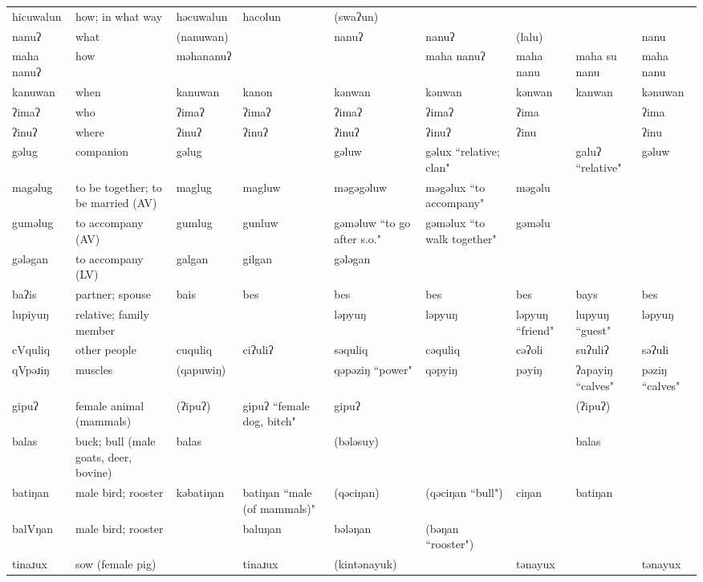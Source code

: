 \begin{landscape}
\begin{longtable}{*{9}{>{\raggedright\arraybackslash}p{}}}
\text{*}hicuwalun & how; in what way & həcuwalun & hacolun & (swaʔun) &  &  &  & \\
\text{*}nanuʔ & what & (nanuwan) &  & nanuʔ & nanuʔ & (lalu) &  & nanu\\
\text{*}maha nanuʔ & how & məhananuʔ &  &  & maha nanuʔ & maha nanu & maha su nanu & maha nanu\\
\text{*}kanuwan & when & kanuwan & kanon & kənwan & kənwan & kənwan & kanwan & kənuwan\\
\text{*}ʔimaʔ & who & ʔimaʔ & ʔimaʔ & ʔimaʔ & ʔimaʔ & ʔima &  & ʔima\\
\text{*}ʔinuʔ & where & ʔinuʔ & ʔinuʔ & ʔinuʔ & ʔinuʔ & ʔinu &  & ʔinu\\
\text{*}gəlug & companion & gəlug &  & gəluw & gəlux ``relative; clan" &  & galuʔ \newline ``relative" & gəluw\\
\text{*}magəlug & to be together; to be married (AV) & maglug & magluw & məgəgəluw & məgəlux ``to accompany" & məgəlu &  & \\
\text{*}guməlug & to accompany (AV) & gumlug & gunluw & gəməluw ``to go after s.o." & gəməlux ``to walk together" & gəməlu &  & \\
\text{*}gələgan & to accompany (LV) & galgan & gilgan & gələgan &  &  &  & \\
\text{*}baʔis & partner; spouse & bais & bes & bes & bes & bes & bays & bes\\
\text{*}lupiyuŋ & relative; family member &  &  & ləpyuŋ & ləpyuŋ & ləpyuŋ ``friend" & lupyuŋ ``guest" & ləpyuŋ\\
\text{*}cVquliq & other people & cuquliq & ciʔuliʔ & səquliq & cəquliq & cəʔoli & suʔuliʔ & səʔuli\\
\text{*}qVpəɹiŋ & muscles & (qapuwiŋ) &  & qəpəziŋ ``power" & qəpyiŋ & pəyiŋ & ʔapayiŋ ``calves" & pəziŋ ``calves"\\
\text{*}gipuʔ & female animal (mammals) & (ʔipuʔ) & gipuʔ ``female dog, bitch" & gipuʔ &  &  & (ʔipuʔ) & \\
\text{*}balas & buck; bull (male goats, deer, bovine) & balas &  & (bələsuy) &  &  & balas & \\
\text{*}batiŋan & male bird; rooster & kəbatiŋan & batiŋan ``male \newline (of mammals)" & (qəciŋan) & (qəciŋan ``bull") & ciŋan & batiŋan & \\
\text{*}balVŋan & male bird; rooster &  & baluŋan & bələŋan & (bəŋan ``rooster") &  &  & \\
\text{*}tinaɹux & sow (female pig) &  & tinaɹux & (kintənayuk) &  & tənayux &  & tənayux\\

\end{longtable}
\end{landscape}

